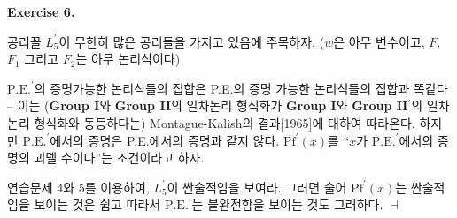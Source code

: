 \documentclass[12pt]{paper}
\newenvironment{context}[1][]
{ \noindent \textbf{{#1}.}
}
{ \hfill $ \dashv $ }
\begin{document}
\begin{context}[Exercise 6]
공리꼴 $L_5^{\prime}$이 무한히 많은 공리들을 가지고 있음에 주목하자.
($w$은 아무 변수이고, $F$, $F_1$ 그리고 $F_2$는 아무 논리식이다)

$\mathrm{P.E.}^{\prime}$의 증명가능한 논리식들의 집합은 P.E.의 증명 가능한 논리식들의 집합과 똑같다 --
이는 (\textbf{Group I}와 \textbf{Group II}의 일차논리 형식화가 \textbf{Group I}와 \textbf{Group II}$^{\prime}$의 일차논리 형식화와 동등하다는) Montague-Kalish의 결과[1965]에 대하여 따라온다.
하지만 $\mathrm{P.E.}^{\prime}$에서의 증명은 P.E.에서의 증명과 같지 않다.
$\mathrm{Pf}^{\prime} \left( x \right)$를 ``$x$가 $\mathrm{P.E.}^{\prime}$에서의 증명의 괴델 수이다''는 조건이라고 하자.

연습문제 4와 5를 이용하여, $L_5^{\prime}$이 싼술적임을 보여라.
그러면 술어 $\mathrm{Pf}^{\prime} \left( x \right)$는 싼술적임을 보이는 것은 쉽고
따라서 $\mathrm{P.E.}^{\prime}$는 불완전함을 보이는 것도 그러하다.
\end{context}
\end{document}
